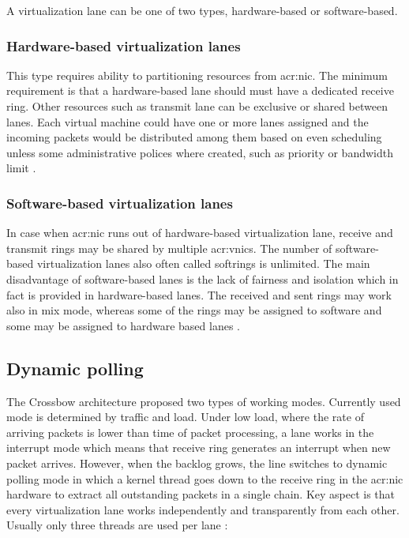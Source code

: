 \documentclass[11pt]{book}
\begin{document}
        A virtualization lane can be one of two types, hardware-based or software-based.

        
        \subsubsection{Hardware-based virtualization lanes}
        
          This type requires ability to partitioning resources from \gls{acr:nic}. The minimum requirement is that a
          hardware-based lane should must have a dedicated receive ring.  Other resources such as transmit lane can be
          exclusive or shared between lanes. Each virtual machine could have one or more lanes assigned and the incoming
          packets would be distributed among them based on even scheduling unless some administrative polices where
          created, such as priority or bandwidth limit \cite{crossbow}.		

        
        \subsubsection{Software-based virtualization lanes}
        
          In case when \gls{acr:nic} runs out of hardware-based virtualization lane, receive and transmit rings may be shared by
          multiple \gls{acr:vnic}s. The number of software-based virtualization lanes also often called softrings is unlimited.
          The main disadvantage of software-based lanes is the lack of fairness and isolation which in fact is provided
          in hardware-based lanes. The received and sent rings may work also in mix mode, whereas some of the rings may
          be assigned to software and some may be assigned to hardware based lanes \cite{crossbow}.	
			
      \subsection{Dynamic polling}	
        
        The Crossbow architecture proposed two types of working modes. Currently used mode is determined by traffic and
        load. Under low load, where the rate of arriving packets is lower than time of packet processing, a lane works in
        the interrupt mode which means that receive ring generates an interrupt when new packet arrives. However, when
        the backlog grows, the line switches to dynamic polling mode in which a kernel thread goes down to the receive
        ring in the \gls{acr:nic} hardware to extract all outstanding packets in a single chain. Key aspect is that every
        virtualization lane works independently and transparently from each other. Usually only three threads are used
        per lane \cite{crossbow}:
        
\end{document}
